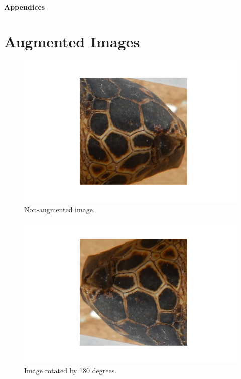\appendix
\Huge{\textbf{Appendices}}

\section{Augmented Images}\label{apx:augmentedImages}

\begin{figure}[h]
    \centering
    \includegraphics{images/turtles/augmented/base.png}
    \caption{Non-augmented image.}
    \label{fig:turtleBase}
\end{figure}

\begin{figure}
    \centering
    \includegraphics{images/turtles/augmented/rotated.png}
    \caption{Image rotated by 180 degrees.}
    \label{fig:turtleRotated}
\end{figure}

